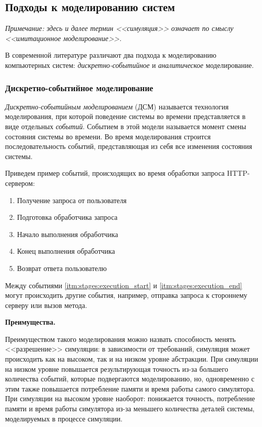 \documentclass[../diploma.tex]{subfile}
\begin{document}
    \subsection{Подходы к моделированию систем}
    \label{sec:review:subsec:simulation_methods}
    
    \textit{
        Примечание: здесь и далее термин <<симуляция>> означает по смыслу
        <<имитационное моделирование>>.
    }

    В современной литературе различают два подхода к моделированию компьютерных
    систем: \textit{дискретно-событийное} и \textit{аналитическое}
    моделирование.

    \subsubsection{Дискретно-событийное моделирование}
    \label{sec:simulation_methods:subsec:discrete_event_modeling}

    \textit{Дискретно-событийным моделированием} (ДСМ) называется технология
    моделирования, при которой поведение системы во времени представляется в
    виде отдельных \textit{событий}. Событием в этой модели называется момент
    смены состояния системы во времени. Во время моделирования строится
    последовательность событий, представляющая из себя все изменения состояния
    системы. 
    
    Приведем пример событий, происходящих во время обработки запроса
    HTTP-сервером: 
    
    \begin{enumerate}
        \item Получение запроса от пользователя
        \item Подготовка обработчика запроса
        \item \label{itm:stages:execution_start} 
              Начало выполнения обработчика
        \item \label{itm:stages:execution_end} 
              Конец выполнения обработчика
        \item Возврат ответа пользователю
    \end{enumerate}

    Между событиями \ref{itm:stages:execution_start} и
    \ref{itm:stages:execution_end} могут происходить другие события, например,
    отправка запроса к стороннему серверу или вызов метода.
    
    {\bf Преимущества.}

    Преимуществом такого моделирования можно назвать способность менять
    <<разрешение>> симуляции: в зависимости от требований, симуляция может
    происходить как на высоком, так и на низком уровне абстракции. При симуляции
    на низком уровне повышается результирующая точность из-за большего
    количества событий, которые подвергаются моделированию, но, одновременно с
    этим также повышается потребление памяти и время работы самого симулятора.
    При симуляции на высоком уровне наоборот: понижается точность, потребление
    памяти и время работы симулятора из-за меньшего количества деталей системы,
    моделируемых в процессе симуляции. 
\end{document}
